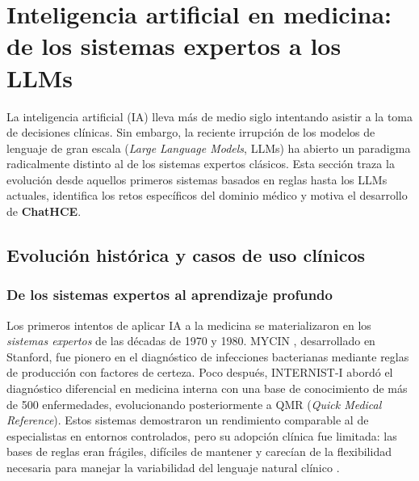 
\section{Inteligencia artificial en medicina: de los sistemas expertos a los LLMs}
\label{sec:ia-medicina}

La inteligencia artificial (\acs{IA}) lleva más de medio siglo intentando asistir a la toma de decisiones clínicas. Sin embargo, la reciente irrupción de los modelos de lenguaje de gran escala (\textit{Large Language Models}, \acs{LLM}s) ha abierto un paradigma radicalmente distinto al de los sistemas expertos clásicos. Esta sección traza la evolución desde aquellos primeros sistemas basados en reglas hasta los \ac{LLM}s actuales, identifica los retos específicos del dominio médico y motiva el desarrollo de \textbf{ChatHCE}.

\subsection{Evolución histórica y casos de uso clínicos}
\label{subsec:evolucion}

\subsubsection*{De los sistemas expertos al aprendizaje profundo}

Los primeros intentos de aplicar \ac{IA} a la medicina se materializaron en los \textit{sistemas expertos} de las décadas de 1970 y 1980. MYCIN \parencite{shortliffe1976}, desarrollado en Stanford, fue pionero en el diagnóstico de infecciones bacterianas mediante reglas de producción con factores de certeza. Poco después, INTERNIST-I \parencite{miller1982} abordó el diagnóstico diferencial en medicina interna con una base de conocimiento de más de 500 enfermedades, evolucionando posteriormente a QMR (\textit{Quick Medical Reference}). Estos sistemas demostraron un rendimiento comparable al de especialistas en entornos controlados, pero su adopción clínica fue limitada: las bases de reglas eran frágiles, difíciles de mantener y carecían de la flexibilidad necesaria para manejar la variabilidad del lenguaje natural clínico \parencite{park2024}.

